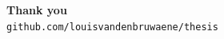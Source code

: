 \documentclass[kul,aspectratio=169]{kulakbeamer}
\begin{document}
\begin{frame}[plain]
\vfill
\begin{center}
{\color{KULblauw3b}\fontsize{40}{46}\selectfont\bfseries Thank you}\\[16pt]
{\color{black!45}\normalsize \texttt{github.com/louisvandenbruwaene/thesis}}
\end{center}
\end{frame}

\end{document}
